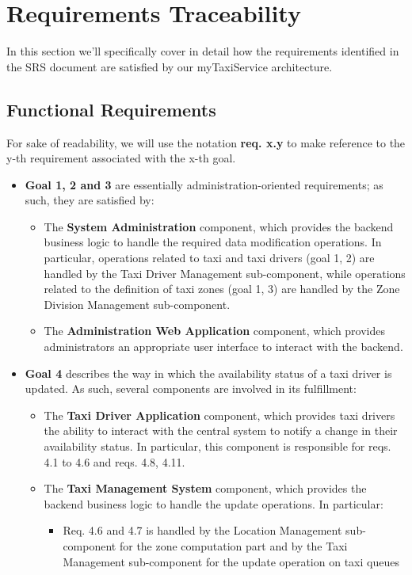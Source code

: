 \chapter{Requirements Traceability}
In this section we'll specifically cover in detail how the requirements identified in the SRS document are satisfied by our myTaxiService architecture. 

\section{Functional Requirements}

For sake of readability, we will use the notation \textbf{req. x.y} to make reference to the y-th requirement associated with the x-th goal.

\begin{itemize}
	\item \textbf{Goal 1, 2 and 3} are essentially administration-oriented requirements; as such, they are satisfied by:
	\begin{itemize}
	\item The \textbf{System Administration} component, which provides the backend business logic to handle the required data modification operations. In particular, operations related to taxi and taxi drivers (goal 1, 2) are handled by the Taxi Driver Management sub-component, while operations related to the definition of taxi zones (goal 1, 3) are handled by the Zone Division Management sub-component.
	\item The \textbf{Administration Web Application} component, which provides administrators an appropriate user interface to interact with the backend.
	\end{itemize}
	\item \textbf{Goal 4} describes the way in which the availability status of a taxi driver is updated. As such, several components are involved in its fulfillment:
	\begin{itemize}
	\item The \textbf{Taxi Driver Application} component, which provides taxi drivers the ability to interact with the central system to notify a change in their availability status. In particular, this component is responsible for reqs. 4.1 to 4.6 and reqs. 4.8, 4.11.
	\item The \textbf{Taxi Management System} component, which provides the backend business logic to handle the update operations. In particular:
	\begin{itemize}
	\item Req. 4.6 and 4.7 is handled by the Location Management sub-component for the zone computation part and by the Taxi Management sub-component for the update operation on taxi queues

\end{itemize}
\end{itemize}
\end{itemize}
